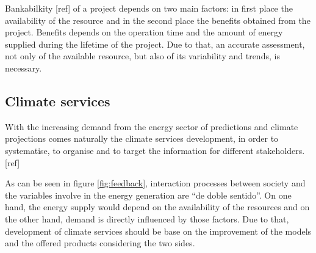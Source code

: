 Bankabilkity [ref] of a project depends on two main factors: in first place the availability of the resource and in the second place the benefits obtained from the project. Benefits depends on the operation time and the amount of energy supplied during the lifetime of the project. Due to that, an accurate assessment, not only of the available resource, but also of its variability and trends, is necessary. 


\subsection{Climate services}


With the increasing demand from the energy sector of predictions and climate projections comes naturally the climate services development, in order to systematise, to organise and to target the information for different stakeholders. [ref]


As can be seen in figure \ref{fig:feedback}, interaction processes between society and the variables involve in the energy generation are ``de doble sentido''. On one hand, the energy supply would depend on the availability of the resources and on the other hand, demand is directly influenced by those factors. Due to that, development of climate services should be base on the improvement of the models and the offered products considering the two sides.   



